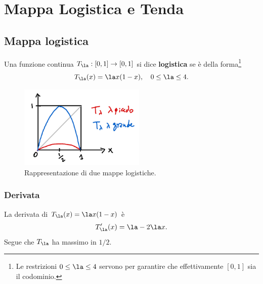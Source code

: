 \section{Mappa Logistica e Tenda}
\subsection{Mappa logistica} 
\begin{definition}
Una funzione continua $T_\la:[0,1]\to[0,1]$ si dice \textbf{logistica} se \`e della forma\footnote{Le restrizioni $0\leq \la\leq 4$ servono per garantire che effettivamente $[0,1]$ sia il codominio.}
\[T_\la(x)=\la x(1-x),\quad 0\leq \la\leq 4.\]
\end{definition}

\begin{figure}[!htb]
    \centering
    \includegraphics[width=6cm]{Immagini/Logistica.png}
    \caption{Rappresentazione di due mappe logistiche.}
\end{figure}

\subsubsection{Derivata}
La derivata di $T_\la(x)=\la x(1-x)$ \`e
\[T'_\la(x)=\la-2\la x.\]
Segue che $T_\la$ ha massimo in $1/2$.
